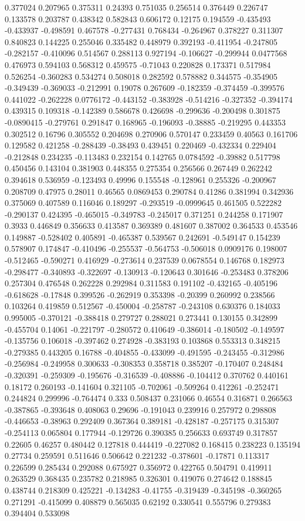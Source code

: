0.377024 0.207965 0.375311 0.24393 0.751035 0.256514 0.376449 0.226747 0.133578 0.203787 0.438342 0.582843 0.606172 0.12175 0.194559 -0.435493 -0.433937 -0.498591 0.467578 -0.277431 0.768434 -0.264967 0.378227 0.311307 0.840823 0.144225 0.255046 0.335482 0.448979 0.392193 -0.411954 -0.247805 -0.282157 -0.410096 0.514567 0.288113 0.927194 -0.106627 -0.299944 0.0477568 0.476973 0.594103 0.568312 0.459575 -0.71043 0.220828 0.173371 0.517984 0.526254 -0.360283 0.534274 0.508018 0.282592 0.578882 0.344575 -0.354905 -0.349439 -0.369033 -0.212991 0.19078 0.267609 -0.182359 -0.374459 -0.399576 0.441022 -0.262228 0.0776172 -0.443152 -0.383928 -0.514216 -0.327352 -0.394174 0.439315 0.109318 -0.142389 0.586678 0.426698 -0.299636 -0.200498 0.301875 -0.0890415 -0.279761 0.291847 0.168965 -0.196093 -0.38885 -0.219295 0.443353 0.302512 0.16796 0.305552 0.204698 0.270906 0.570147 0.233459 0.40563 0.161706 0.129582 0.421258 -0.288439 -0.38493 0.439451 0.220469 -0.432334 0.229404 -0.212848 0.234235 -0.113483 0.232154 0.142765 0.0784592 -0.39882 0.517798 0.450456 0.143104 0.381903 0.448355 0.275354 0.256566 0.267449 0.262242 0.394618 0.536959 -0.123493 0.49996 0.155548 -0.128961 0.255326 -0.200967 0.208709 0.47975 0.28011 0.46565 0.0869453 0.290784 0.41286 0.381994 0.342936 0.375069 0.407589 0.116046 0.189297 -0.293519 -0.0999645 0.461505 0.522282 -0.290137 0.424395 -0.465015 -0.349783 -0.245017 0.371251 0.244258 0.171907 0.3933 0.446849 0.356633 0.413587 0.369389 0.481607 0.387002 0.364533 0.453546 0.149887 -0.528402 0.405891 -0.465387 0.539567 0.242691 -0.549147 0.154239 0.578907 0.174847 -0.410496 -0.255537 -0.564753 -0.506018 0.0909176 0.198007 -0.512465 -0.590271 0.416929 -0.273614 0.237539 0.0678554 0.146768 0.182973 -0.298477 -0.340893 -0.322697 -0.130913 -0.120643 0.301646 -0.253483 0.378206 0.257304 0.476548 0.262228 0.292984 0.311583 0.191102 -0.432165 -0.405196 -0.618628 -0.17848 0.399526 -0.262919 0.353398 -0.20399 0.260992 0.238566 0.103264 0.419859 0.512567 -0.450004 -0.258787 -0.243108 0.630376 0.184033 0.995005 -0.370121 -0.388418 0.279727 0.288021 0.273441 0.130155 0.342899 -0.455704 0.14061 -0.221797 -0.280572 0.410649 -0.386014 -0.180502 -0.149597 -0.135756 0.106018 -0.397462 0.274928 -0.383193 0.103868 0.553313 0.348215 -0.279385 0.443205 0.16788 -0.404855 -0.433099 -0.491595 -0.243455 -0.312986 -0.256984 -0.249958 0.300633 -0.308353 0.358718 0.385207 -0.170407 0.248484 -0.320391 -0.259309 -0.195676 -0.316539 -0.408886 -0.104412 0.370762 0.440161 0.18172 0.260193 -0.141604 0.321105 -0.702061 -0.509264 0.412261 -0.252471 0.244824 0.299996 -0.764474 0.333 0.508437 0.231066 0.46554 0.316871 0.266563 -0.387865 -0.393648 0.408063 0.29696 -0.191043 0.239916 0.257972 0.298808 -0.446653 -0.38963 0.292409 0.367364 0.389181 -0.428187 -0.257175 0.315307 -0.254113 0.065804 0.177944 -0.129726 0.390385 0.256633 0.693749 0.317857 0.22605 0.46257 0.480442 0.127818 0.444419 -0.227082 0.168415 0.238223 0.135194 0.27734 0.259591 0.511646 0.506642 0.221232 -0.378601 -0.17871 0.113317 0.226599 0.285434 0.292088 0.675927 0.356972 0.422765 0.504791 0.419911 0.263529 0.368435 0.235782 0.218985 0.326301 0.419076 0.274642 0.188845 0.438744 0.218309 0.425221 -0.134283 -0.41755 -0.319439 -0.345198 -0.360265 0.271291 -0.415099 0.408879 0.565035 0.62192 0.330541 0.555796 0.279383 0.394404 0.533098 